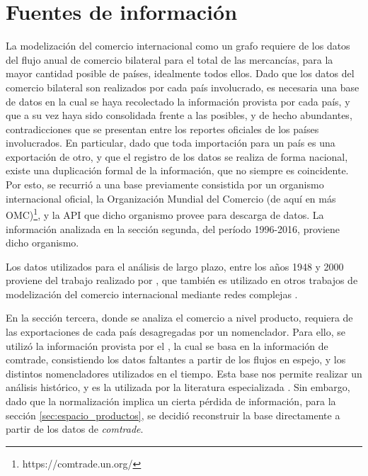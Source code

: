 \documentclass[class=article, crop=false]{standalone}
\begin{document}


\section{Fuentes de información}


La modelización del comercio internacional como un grafo requiere de los datos del flujo anual de comercio bilateral para el total de las mercancías, para la mayor cantidad posible de países, idealmente todos ellos. Dado que los datos del comercio bilateral son realizados por cada país involucrado, es necesaria una base de datos en la cual se haya recolectado la información provista por cada país, y que a su vez haya sido consolidada frente a las posibles, y de hecho abundantes, contradicciones que se presentan entre los reportes oficiales de los países involucrados. En particular, dado que toda importación para un país es una exportación de otro, y que el registro de los datos se realiza de forma nacional, existe una duplicación formal de la información, que no siempre es coincidente. Por esto, se recurrió a una base previamente consistida por un organismo internacional oficial, la Organización Mundial del Comercio (de aquí en más OMC)\footnote{https://comtrade.un.org/}, y la API que dicho organismo provee para descarga de datos. La información analizada  en la sección segunda, del período 1996-2016, proviene dicho organismo.

Los datos utilizados para el análisis de largo plazo, entre los años 1948 y 2000 proviene del trabajo realizado por \cite{Gleditsch2002}, que también es utilizado en otros trabajos de modelización del comercio internacional mediante redes complejas \cite{Fagiolo2010}.

En la sección tercera, donde se analiza el comercio a nivel producto, requiera de las exportaciones de cada país desagregadas por un nomenclador. Para ello, se utilizó la información provista por el \cite{CenterforInternationalDevelopmentatHarvardUniversity}, la cual se basa en la información de comtrade, consistiendo los datos faltantes a partir de los flujos en espejo, y los distintos nomencladores utilizados en el tiempo. Esta base nos permite realizar un análisis histórico, y es la utilizada por la literatura especializada \citep{Hidalgo2007, Hidalgo2009, Hidalgo2009a}. Sin embargo, dado que la normalización implica un cierta pérdida de información, para la sección \ref{sec:espacio_productos}, se decidió reconstruir la base directamente a partir de los datos de \textit{comtrade}.
\end{document}
